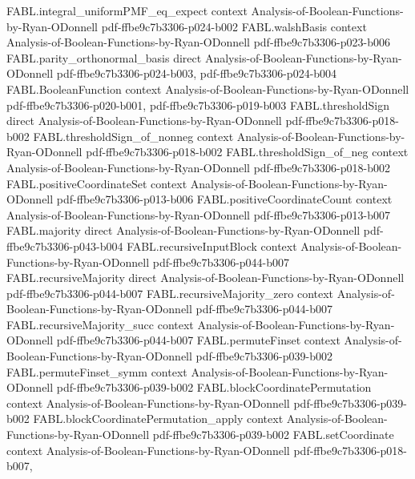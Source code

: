\begin{theorem}
\proofstep
  {FABL.integral_uniformPMF_eq_expect}
  {context}
  {Analysis-of-Boolean-Functions-by-Ryan-ODonnell}
  {pdf-ffbe9c7b3306-p024-b002}
\proofstep
  {FABL.walshBasis}
  {context}
  {Analysis-of-Boolean-Functions-by-Ryan-ODonnell}
  {pdf-ffbe9c7b3306-p023-b006}
\proofstep
  {FABL.parity_orthonormal_basis}
  {direct}
  {Analysis-of-Boolean-Functions-by-Ryan-ODonnell}
  {pdf-ffbe9c7b3306-p024-b003,
    pdf-ffbe9c7b3306-p024-b004}
\proofstep
  {FABL.BooleanFunction}
  {context}
  {Analysis-of-Boolean-Functions-by-Ryan-ODonnell}
  {pdf-ffbe9c7b3306-p020-b001,
    pdf-ffbe9c7b3306-p019-b003}
\proofstep
  {FABL.thresholdSign}
  {direct}
  {Analysis-of-Boolean-Functions-by-Ryan-ODonnell}
  {pdf-ffbe9c7b3306-p018-b002}
\proofstep
  {FABL.thresholdSign_of_nonneg}
  {context}
  {Analysis-of-Boolean-Functions-by-Ryan-ODonnell}
  {pdf-ffbe9c7b3306-p018-b002}
\proofstep
  {FABL.thresholdSign_of_neg}
  {context}
  {Analysis-of-Boolean-Functions-by-Ryan-ODonnell}
  {pdf-ffbe9c7b3306-p018-b002}
\proofstep
  {FABL.positiveCoordinateSet}
  {context}
  {Analysis-of-Boolean-Functions-by-Ryan-ODonnell}
  {pdf-ffbe9c7b3306-p013-b006}
\proofstep
  {FABL.positiveCoordinateCount}
  {context}
  {Analysis-of-Boolean-Functions-by-Ryan-ODonnell}
  {pdf-ffbe9c7b3306-p013-b007}
\proofstep
  {FABL.majority}
  {direct}
  {Analysis-of-Boolean-Functions-by-Ryan-ODonnell}
  {pdf-ffbe9c7b3306-p043-b004}
\proofstep
  {FABL.recursiveInputBlock}
  {context}
  {Analysis-of-Boolean-Functions-by-Ryan-ODonnell}
  {pdf-ffbe9c7b3306-p044-b007}
\proofstep
  {FABL.recursiveMajority}
  {direct}
  {Analysis-of-Boolean-Functions-by-Ryan-ODonnell}
  {pdf-ffbe9c7b3306-p044-b007}
\proofstep
  {FABL.recursiveMajority_zero}
  {context}
  {Analysis-of-Boolean-Functions-by-Ryan-ODonnell}
  {pdf-ffbe9c7b3306-p044-b007}
\proofstep
  {FABL.recursiveMajority_succ}
  {context}
  {Analysis-of-Boolean-Functions-by-Ryan-ODonnell}
  {pdf-ffbe9c7b3306-p044-b007}
\proofstep
  {FABL.permuteFinset}
  {context}
  {Analysis-of-Boolean-Functions-by-Ryan-ODonnell}
  {pdf-ffbe9c7b3306-p039-b002}
\proofstep
  {FABL.permuteFinset_symm}
  {context}
  {Analysis-of-Boolean-Functions-by-Ryan-ODonnell}
  {pdf-ffbe9c7b3306-p039-b002}
\proofstep
  {FABL.blockCoordinatePermutation}
  {context}
  {Analysis-of-Boolean-Functions-by-Ryan-ODonnell}
  {pdf-ffbe9c7b3306-p039-b002}
\proofstep
  {FABL.blockCoordinatePermutation_apply}
  {context}
  {Analysis-of-Boolean-Functions-by-Ryan-ODonnell}
  {pdf-ffbe9c7b3306-p039-b002}
\proofstep
  {FABL.setCoordinate}
  {context}
  {Analysis-of-Boolean-Functions-by-Ryan-ODonnell}
  {pdf-ffbe9c7b3306-p018-b007,
}
\end{theorem}
